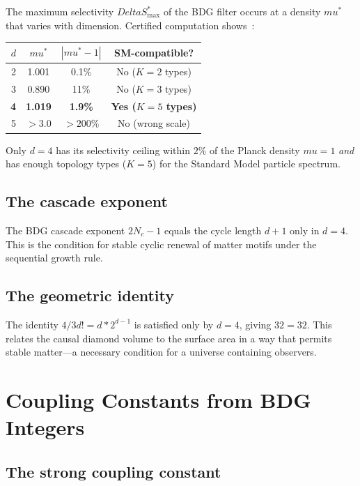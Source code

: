 \documentclass[11pt]{article}
\def\Delta{Delta}%
\def\mu{mu}%
\def\frac#1#2{#1/#2}%
\def\cdot{*}%
\begin{document}
The maximum selectivity $\Delta S^*_{\max}$ of the BDG filter occurs at a density $\mu^*$ that varies with dimension. Certified computation shows~\cite{D4U02}:
\begin{center}
\begin{tabular}{rccc}
\toprule
$d$ & $\mu^*$ & $|\mu^*-1|$ & SM-compatible? \\
\midrule
2 & 1.001 & 0.1\% & No ($K=2$ types) \\
3 & 0.890 & 11\% & No ($K=3$ types) \\
\textbf{4} & \textbf{1.019} & \textbf{1.9\%} & \textbf{Yes ($K=5$ types)} \\
5 & $>3.0$ & $>200\%$ & No (wrong scale) \\
\bottomrule
\end{tabular}
\end{center}

Only $d=4$ has its selectivity ceiling within $2\%$ of the Planck density $\mu=1$ \emph{and} has enough topology types ($K=5$) for the Standard Model particle spectrum.

\subsection{The cascade exponent}

The BDG cascade exponent $2N_c-1$ equals the cycle length $d+1$ only in $d=4$. This is the condition for stable cyclic renewal of matter motifs under the sequential growth rule.

\subsection{The geometric identity}

The identity $\frac{4}{3}d! = d\cdot 2^{d-1}$ is satisfied only by $d=4$, giving $32=32$. This relates the causal diamond volume to the surface area in a way that permits stable matter---a necessary condition for a universe containing observers.

\section{Coupling Constants from BDG Integers}
\label{sec:couplings}

\subsection{The strong coupling constant}
\end{document}
